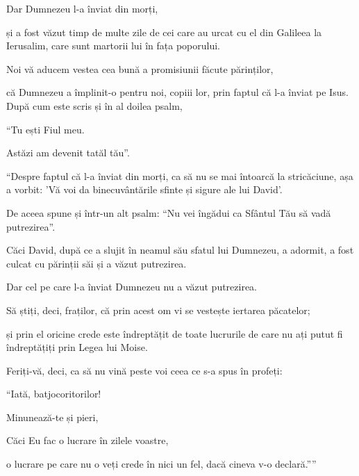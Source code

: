 {Dar Dumnezeu l-a înviat din morți,

și a fost văzut timp de multe zile de cei care au urcat cu el din Galileea la Ierusalim, care sunt martorii lui în fața poporului.

Noi vă aducem vestea cea bună a promisiunii făcute părinților,

că Dumnezeu a împlinit-o pentru noi, copiii lor, prin faptul că l-a înviat pe Isus. După cum este scris și în al doilea psalm,

\par }{\Q “Tu ești Fiul meu.

\par }{\QB Astăzi am devenit tatăl tău”.


\par }{\PP {}“Despre faptul că l-a înviat din morți, ca să nu se mai întoarcă la stricăciune, așa a vorbit: 'Vă voi da binecuvântările sfinte și sigure ale lui David'.

De aceea spune și într-un alt psalm: “Nu vei îngădui ca Sfântul Tău să vadă putrezirea”.

Căci David, după ce a slujit în neamul său sfatul lui Dumnezeu, a adormit, a fost culcat cu părinții săi și a văzut putrezirea.

Dar cel pe care l-a înviat Dumnezeu nu a văzut putrezirea.

Să știți, deci, fraților, că prin acest om vi se vestește iertarea păcatelor;

și prin el oricine crede este îndreptățit de toate lucrurile de care nu ați putut fi îndreptățiți prin Legea lui Moise.

Feriți-vă, deci, ca să nu vină peste voi ceea ce s-a spus în profeți:


\par }{\Q {}“Iată, batjocoritorilor!

\par }{\QB Minunează-te și pieri,

\par }{\QB Căci Eu fac o lucrare în zilele voastre,

\par }{\QB o lucrare pe care nu o veți crede în nici un fel, dacă cineva v-o declară.””


}
